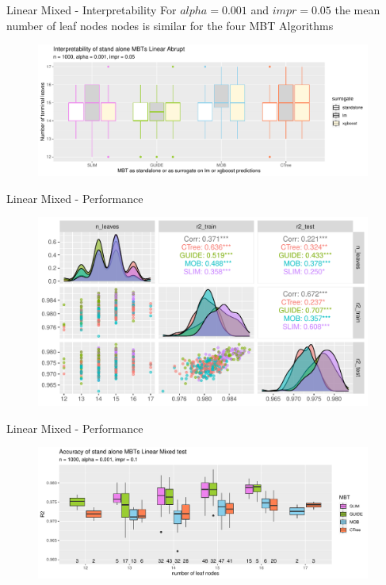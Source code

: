 \documentclass[9pt, xcolor=table]{beamer}
\begin{document}
\begin{frame}{Linear Mixed - Interpretability}
For  $alpha= 0.001$ and $impr = 0.05$ the mean number of leaf nodes nodes is similar for the four MBT Algorithms
\begin{figure}
    \includegraphics[width=11cm]{Figures/simulations/batchtools/basic_scenarios/linear_mixed/lm_1000_int.pdf}
\end{figure}     
\end{frame}

\begin{frame}{Linear Mixed - Performance}

\begin{figure}
    \includegraphics[width=11cm]{Figures/simulations/batchtools/basic_scenarios/linear_mixed/lm_1000_standalone_r2_nleaves.pdf}
\end{figure}  
\end{frame}

\begin{frame}{Linear Mixed - Performance}

\begin{figure}
    \includegraphics[width=11cm]{Figures/simulations/batchtools/basic_scenarios/linear_mixed/lm_1000_standalone_r2_test.pdf}
\end{figure}  
\end{frame}
\end{document}
